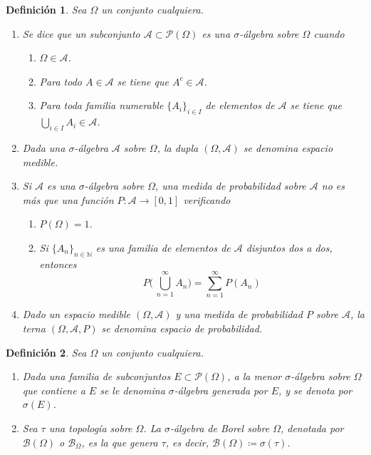 \documentclass[11pt]{report}
\newtheorem{definition}{Definición}
\theoremstyle{definition}
\newcommand{\N}{\mathbb N}
\begin{document}
\begin{definition}
    Sea $\Omega$ un conjunto cualquiera.
\begin{enumerate}
    \item Se dice que un subconjunto $\mathcal{A} \subset \mathcal{P}(\Omega)$ es una \emph{$\sigma$-álgebra sobre $\Omega$} cuando
    \begin{enumerate}
    \item[\emph{(i.1)}] $\Omega \in \mathcal{A}$.
    \item[\emph{(i.2)}] Para todo $A \in \mathcal{A}$ se tiene que $A^c \in \mathcal{A}$.
    \item[\emph{(i.3)}] Para toda familia numerable $\{A_i\}_{i \in I}$ de elementos de $\mathcal{A}$ se tiene que $\bigcup_{i \in I} A_i \in \mathcal{A}$.
    \end{enumerate}
    \item Dada una $\sigma$-álgebra $\mathcal{A}$ sobre $\Omega$, la dupla $(\Omega,\mathcal{A})$ se denomina \emph{espacio medible}.
    \item Si $\mathcal{A}$ es una $\sigma$-álgebra sobre $\Omega$, una \emph{medida de probabilidad sobre $\mathcal{A}$} no es más que una función $P \colon \mathcal{A} \to [0,1]$ verificando
    \begin{enumerate}
    \item[\emph{(ii.1)}] $P(\Omega) = 1$.
    \item[\emph{(ii.2)}] Si $\{A_n\}_{n \in \N}$ es una familia de elementos de $\mathcal{A}$ disjuntos dos a dos, entonces
    \[P\biggl( \, \bigcup_{n=1}^\infty A_n\biggr) = \sum_{n=1}^\infty P(A_n)\]
    \end{enumerate}
    \item Dado un espacio medible $(\Omega,\mathcal{A})$ y una medida de probabilidad $P$ sobre $\mathcal{A}$, la terna $(\Omega,\mathcal{A},P)$ se denomina \emph{espacio de probabilidad}.
\end{enumerate}
\end{definition}

\begin{definition}
Sea $\Omega$ un conjunto cualquiera. 

\begin{enumerate}
    \item Dada una familia de subconjuntos $E \subset \mathcal{P}(\Omega)$, a la menor $\sigma$-álgebra sobre $\Omega$ que contiene a $E$ se le denomina \emph{$\sigma$-álgebra generada por $E$}, y se denota por $\sigma(E)$.
    \item Sea $\tau$ una topología sobre $\Omega$. La \emph{$\sigma$-álgebra de Borel sobre $\Omega$}, denotada por $\mathcal{B}(\Omega)$ o $\mathcal{B}_{\Omega}$, es la que genera $\tau$, es decir, $\mathcal{B}(\Omega) \coloneqq \sigma(\tau)$.
\end{enumerate}
\end{definition}
\end{document}
